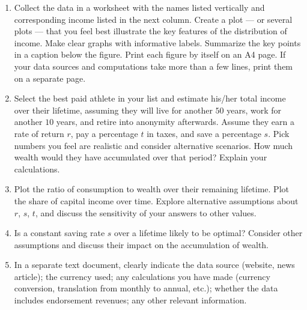 \documentclass[a4,11pt]{article}%
\begin{document}
\setlength{\leftmargini}{1em}
\begin{enumerate}

\item 
Collect the data in a worksheet with the names listed vertically and corresponding income listed in the next column. Create a plot --- or several plots --- that you feel best illustrate the key features of the distribution of income. Make clear graphs with informative labels. Summarize the key points in a caption below the figure. Print each figure by itself on an A4 page. If your data sources and computations take more than a few lines, print them on a separate page. 

\item 
Select the best paid athlete in your list and estimate his/her total income over their lifetime, assuming they will live for another $50$ years, work for another $10$ years, and retire into anonymity afterwards. Assume they earn a rate of return $r$, pay a percentage $t$ in taxes, and save a percentage $s$. Pick numbers you feel are realistic and consider alternative scenarios. How much wealth would they have accumulated over that period? Explain your calculations.

\item 
Plot the ratio of consumption to wealth over their remaining lifetime. Plot the share of capital income over time. Explore alternative assumptions about $r$, $s$, $t$, and discuss the sensitivity of your answers to other values.

\item 
Is a constant saving rate $s$ over a lifetime likely to be optimal? Consider other assumptions and discuss their impact on the accumulation of wealth. 

\item
In a separate text document, clearly indicate the data source (website, news article); the currency used; any calculations you have made (currency conversion, translation from monthly to annual, etc.); whether the data includes endorsement revenues; any other relevant information. 

\end{enumerate}
\end{document}
